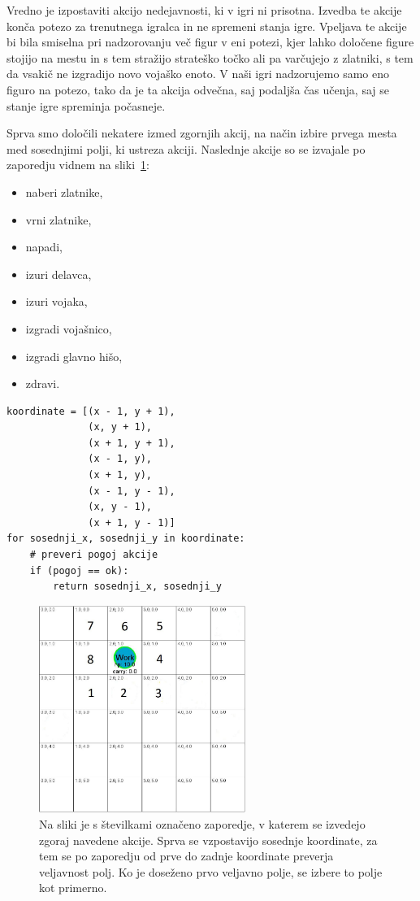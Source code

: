 \documentclass[a4paper, 12pt]{book}
\begin{document}
Vredno je izpostaviti akcijo nedejavnosti, ki v igri ni prisotna.
Izvedba te akcije konča potezo za trenutnega igralca in ne spremeni stanja igre.
Vpeljava te akcije bi bila smiselna pri nadzorovanju več figur v eni potezi, kjer lahko določene figure stojijo na mestu in s tem stražijo strateško točko ali pa varčujejo z zlatniki, s tem da vsakič ne izgradijo novo vojaško enoto.
V naši igri nadzorujemo samo eno figuro na potezo, tako da je ta akcija odvečna, saj podaljša čas učenja, saj se stanje igre spreminja počasneje.



Sprva smo določili nekatere izmed zgornjih akcij, na način izbire prvega mesta med sosednjimi polji, ki ustreza akciji. 
Naslednje akcije so se izvajale po zaporedju vidnem na sliki~\ref{pickorakiPreverjanja}:
\begin{itemize}
	\item naberi zlatnike,
	\item vrni zlatnike,
	\item napadi,
	\item izuri delavca,
	\item izuri vojaka, 
	\item izgradi vojašnico,
	\item izgradi glavno hišo,
	\item zdravi.
\end{itemize}
\begin{verbatim}
koordinate = [(x - 1, y + 1),
              (x, y + 1),
              (x + 1, y + 1),
              (x - 1, y),
              (x + 1, y),
              (x - 1, y - 1),
              (x, y - 1),
              (x + 1, y - 1)]
for sosednji_x, sosednji_y in koordinate:
    # preveri pogoj akcije
    if (pogoj == ok):
        return sosednji_x, sosednji_y
\end{verbatim}

\begin{figure}[h!]
	\begin{center}
		\includegraphics[width=0.6\textwidth]{photos/korakiPreverjanja.pdf}
	\end{center}
	\caption{Na sliki je s številkami označeno zaporedje, v katerem se izvedejo zgoraj navedene akcije. 
		Sprva se vzpostavijo sosednje koordinate, za tem se po zaporedju od prve do zadnje koordinate preverja veljavnost polj. 
		Ko je doseženo prvo veljavno polje, se izbere to polje kot primerno. }
	\label{pickorakiPreverjanja}
\end{figure}
\end{document}
